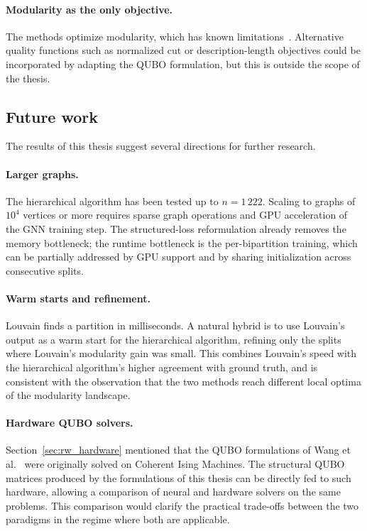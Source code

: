 \paragraph{Modularity as the only objective.} The methods
optimize modularity, which has known
limitations~\cite{fortunato2007resolution, good2010performance}.
Alternative quality functions such as normalized cut or
description-length objectives could be incorporated by adapting
the QUBO formulation, but this is outside the scope of the
thesis.


\subsection{Future work}
\label{sec:future}

The results of this thesis suggest several directions for further
research.

\paragraph{Larger graphs.} The hierarchical algorithm has been
tested up to $n = 1\,222$. Scaling to graphs of $10^4$ vertices
or more requires sparse graph operations and GPU acceleration of
the GNN training step. The structured-loss reformulation
already removes the memory bottleneck; the runtime bottleneck is
the per-bipartition training, which can be partially addressed by
GPU support and by sharing initialization across consecutive
splits.

\paragraph{Warm starts and refinement.} Louvain finds a partition
in milliseconds. A natural hybrid is to use Louvain's output as a
warm start for the hierarchical algorithm, refining only the
splits where Louvain's modularity gain was small. This combines
Louvain's speed with the hierarchical algorithm's higher
agreement with ground truth, and is consistent with the
observation that the two methods reach different local optima of
the modularity landscape.

\paragraph{Hardware QUBO solvers.} Section~\ref{sec:rw_hardware}
mentioned that the QUBO formulations of Wang et
al.~\cite{wang2024quantum} were originally solved on Coherent
Ising Machines. The structural QUBO matrices produced by the
formulations of this thesis can be directly fed to such hardware,
allowing a comparison of neural and hardware solvers on the same
problems. This comparison would clarify the practical trade-offs
between the two paradigms in the regime where both are
applicable.



